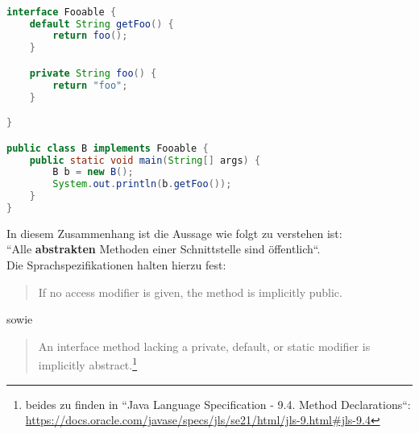 \begin{lstlisting}[language=java]

interface Fooable {
    default String getFoo() {
        return foo();
    }

    private String foo() {
        return "foo";
    }

}

public class B implements Fooable {
    public static void main(String[] args) {
        B b = new B();
        System.out.println(b.getFoo());
    }
}

\end{lstlisting}

In diesem Zusammenhang  ist die Aussage wie folgt zu verstehen ist:\\

``Alle \textbf{abstrakten} Methoden einer Schnittstelle sind öffentlich``.\\

Die Sprachspezifikationen halten hierzu fest:
\blockquote{
    If no access modifier is given, the method is implicitly public.
}
sowie
\blockquote{
    An interface method lacking a private, default, or static modifier is implicitly abstract.\footnote{
    beides zu finden in  ``Java Language Specification - 9.4. Method Declarations``: \url{https://docs.oracle.com/javase/specs/jls/se21/html/jls-9.html#jls-9.4}
    }
}
